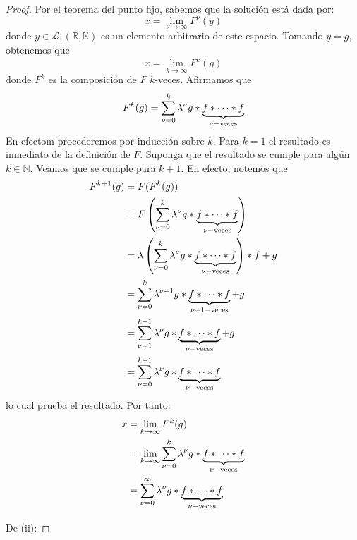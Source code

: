 \documentclass[12pt]{report}
\newcounter{it}
\theoremstyle{largebreak}
\begin{document}
\begin{proof}
        Por el teorema del punto fijo, sabemos que la solución está dada por:
        \begin{equation*}
            x=\lim_{\nu\rightarrow\infty}F^\nu(y)
        \end{equation*}
        donde $y\in\mathcal{L}_1(\mathbb{R},\mathbb{K})$ es un elemento arbitrario de este espacio. Tomando $y=g$, obtenemos que
        \begin{equation*}
            x=\lim_{k\rightarrow\infty}F^k(g)
        \end{equation*}
        donde $F^k$ es la composición de $F$ $k$-veces. Afirmamos que
        \begin{equation*}
            F^k(g)=\sum_{\nu=0}^k\lambda^\nu g*\underbrace{f*\cdots*f}_{\nu-\textup{veces}}
        \end{equation*}
        En efectom procederemos por inducción sobre $k$. Para $k=1$ el resultado es inmediato de la definición de $F$. Suponga que el resultado se cumple para algún $k\in\mathbb{N}$. Veamos que se cumple para $k+1$. En efecto, notemos que
        \begin{equation*}
            \begin{split}
                F^{k+1}(g)&=F(F^k(g))\\
                &=F\left(\sum_{\nu=0}^k\lambda^\nu g*\underbrace{f*\cdots*f}_{\nu-\textup{veces}} \right)\\
                &=\lambda\left(\sum_{\nu=0}^k\lambda^\nu g*\underbrace{f*\cdots*f}_{\nu-\textup{veces}}\right)*f+g\\
                &=\sum_{\nu=0}^k\lambda^{\nu+1} g*\underbrace{f*\cdots*f}_{\nu+1-\textup{veces}}+g\\
                &=\sum_{\nu=1}^{k+1}\lambda^{\nu} g*\underbrace{f*\cdots*f}_{\nu-\textup{veces}}+g\\
                &=\sum_{\nu=0}^{k+1}\lambda^{\nu} g*\underbrace{f*\cdots*f}_{\nu-\textup{veces}}\\
            \end{split}
        \end{equation*}
        lo cual prueba el resultado. Por tanto:
        \begin{equation*}
            \begin{split}
                x&=\lim_{ k\rightarrow\infty}F^k(g)\\
                &=\lim_{ k\rightarrow\infty}\sum_{\nu=0}^{k}\lambda^{\nu} g*\underbrace{f*\cdots*f}_{\nu-\textup{veces}}\\
                &=\sum_{\nu=0}^{\infty}\lambda^{\nu} g*\underbrace{f*\cdots*f}_{\nu-\textup{veces}}\\
            \end{split}
        \end{equation*}
        
        De (ii): 
    \end{proof}
\end{document}
